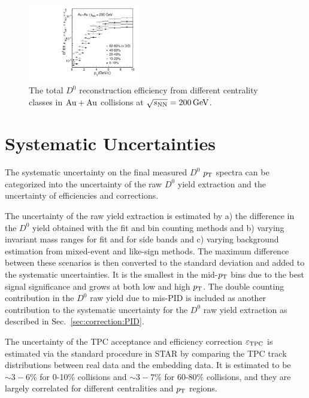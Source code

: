 \documentclass[%
 reprint,	
 amsmath,amssymb,
 aps,
 prc,
]{revtex4-1}
\begin{document}
\begin{figure}
\centering
\includegraphics[width=0.43\textwidth]{fig/Datad0Eff_10.pdf}
\caption{The total $D^{0}$ reconstruction efficiency from different centrality classes in ${\rm{Au + Au}}$ collisions at ${\sqrt{s_{\rm NN}} = \rm{200\,GeV}}$.}
\label{fig:Datad0Eff} 
\end{figure}

\section{\label{sec:systematic}Systematic Uncertainties}

The systematic uncertainty on the final measured $D^0$ $p_{\rm T}$ spectra can be categorized into the uncertainty of the raw $D^0$ yield extraction and the uncertainty of efficiencies and corrections.

The uncertainty of the raw yield extraction is estimated by a) the difference in the $D^0$ yield obtained with the fit and bin counting methods and b) varying invariant mass ranges for fit and for side bands and c) varying background estimation from mixed-event and like-sign methods. The maximum difference between these scenarios is then converted to the standard deviation and added to the systematic uncertainties. It is the smallest in the mid-$p_{\rm T}$ bins due to the best signal significance and grows at both low and high $p_{\rm T}$. The double counting contribution in the $D^0$ raw yield  due to mis-PID is included as another contribution to the systematic uncertainty for the $D^0$ raw yield extraction as described in Sec.~\ref{sec:correction:PID}.

The uncertainty of the TPC acceptance and efficiency correction $\varepsilon_{\rm TPC}$ is estimated via the standard procedure in STAR by comparing the TPC track distributions between real data and the embedding data. It is estimated to be $\sim 3-6\%$ for 0-10\% collisions and $\sim 3-7\%$ for 60-80\% collisions, and they are largely correlated for different centralities and $p_{\rm T}$ regions. 
\end{document}
